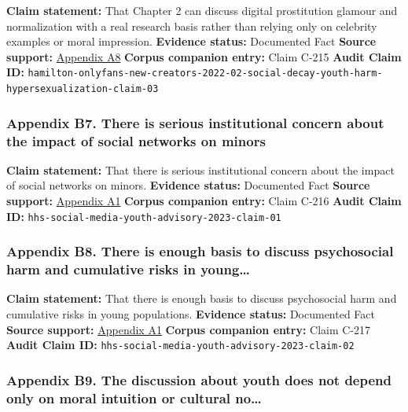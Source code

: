 \documentclass[
  american,
  11pt,
  letterpaper,
]{article}
\begin{document}
\textbf{Claim statement:} That Chapter 2 can discuss digital
prostitution glamour and normalization with a real research basis rather
than relying only on celebrity examples or moral impression.
\textbf{Evidence status:} Documented Fact \textbf{Source support:}
\hyperref[ch-02-appendix-a8-nudes-shouldn-t-i-charge-for-these-motivations-of-new-sexual-content-creators-on-onlyfans]{Appendix
A8} \textbf{Corpus companion entry:} Claim C-215 \textbf{Audit Claim
ID:}
\texttt{hamilton-onlyfans-new-creators-2022-02-social-decay-youth-harm-hypersexualization-claim-03}

\subsubsection{Appendix B7. There is serious institutional concern about
the impact of social networks on
minors}\label{ch-02-appendix-b7-there-is-serious-institutional-concern-about-the-impact-of-social-networks-on-minors}

\textbf{Claim statement:} That there is serious institutional concern
about the impact of social networks on minors. \textbf{Evidence status:}
Documented Fact \textbf{Source support:}
\hyperref[ch-02-appendix-a1-social-media-and-youth-mental-health-the-u-s-surgeon-general-s-advisory]{Appendix
A1} \textbf{Corpus companion entry:} Claim C-216 \textbf{Audit Claim
ID:} \texttt{hhs-social-media-youth-advisory-2023-claim-01}

\subsubsection{Appendix B8. There is enough basis to discuss
psychosocial harm and cumulative risks in
young\ldots{}}\label{ch-02-appendix-b8-there-is-enough-basis-to-discuss-psychosocial-harm-and-cumulative-risks-in-young}

\textbf{Claim statement:} That there is enough basis to discuss
psychosocial harm and cumulative risks in young populations.
\textbf{Evidence status:} Documented Fact \textbf{Source support:}
\hyperref[ch-02-appendix-a1-social-media-and-youth-mental-health-the-u-s-surgeon-general-s-advisory]{Appendix
A1} \textbf{Corpus companion entry:} Claim C-217 \textbf{Audit Claim
ID:} \texttt{hhs-social-media-youth-advisory-2023-claim-02}

\subsubsection{Appendix B9. The discussion about youth does not depend
only on moral intuition or cultural
no\ldots{}}\label{ch-02-appendix-b9-the-discussion-about-youth-does-not-depend-only-on-moral-intuition-or-cultural-no}
\end{document}
